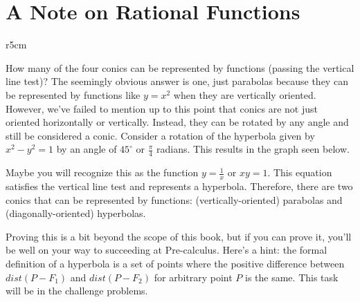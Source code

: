 \documentclass[../book.tex]{subfiles}
\begin{document}
\section{A Note on Rational Functions}
\begin{wrapfigure}{r}{5cm}
\end{wrapfigure}

\noindent How many of the four conics can be represented by functions (passing the vertical line test)?  The seemingly obvious answer is one, just parabolas because they can be represented by functions like $y=x^2$ when they are vertically oriented.  However, we've failed to mention up to this point that conics are not just oriented horizontally or vertically.  Instead, they can be rotated by any angle and still be considered a conic.  Consider a rotation of the hyperbola given by $x^2-y^2=1$ by an angle of $45^{\circ}$ or $\frac{\pi}{4}$ radians.  This results in the graph seen below.

Maybe you will recognize this as the function $y=\frac{1}{x}$ or $xy=1$.  This equation satisfies the vertical line test and represents a hyperbola.  Therefore, there are two conics that can be represented by functions: (vertically-oriented) parabolas and (diagonally-oriented) hyperbolas.

Proving this is a bit beyond the scope of this book, but if you can prove it, you'll be well on your way to succeeding at Pre-calculus.  Here's a hint: the formal definition of a hyperbola is a set of points where the positive difference between $dist(P-F_1)$ and $dist(P-F_2)$ for arbitrary point $P$ is the same. This task will be in the challenge problems.
\end{document}
